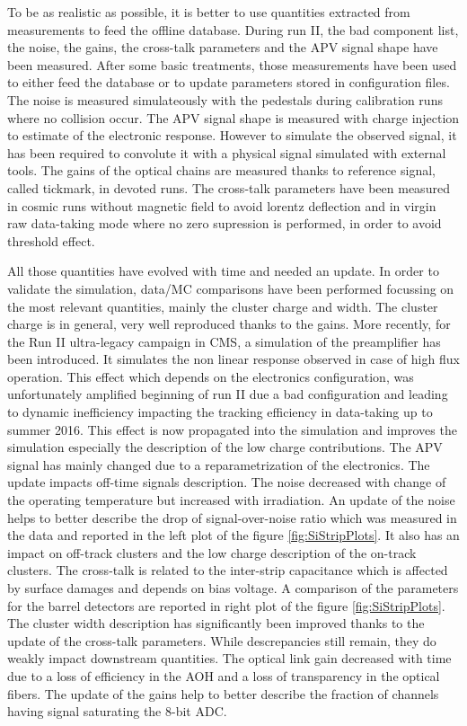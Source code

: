  
To be as realistic as possible, it is better to use quantities extracted from measurements to feed the offline database.%
During run II, the bad component list, the noise, the gains, the cross-talk parameters and the APV signal shape have been measured.
After some basic treatments, those measurements have been used to either feed the database or to update parameters stored in configuration files.
The noise is measured simulateously with the pedestals during calibration runs where no collision occur.
The APV signal shape is measured with charge injection 
to estimate of the electronic response.
However to simulate the observed signal, it has been required to convolute it with a physical signal simulated with external tools.
The gains of the optical chains are measured thanks to reference signal, called tickmark, in devoted runs.
The cross-talk parameters have been measured in cosmic runs without magnetic field to avoid lorentz deflection and in virgin raw data-taking mode where no zero supression is performed, in order to avoid threshold effect.

All those quantities have evolved with time and needed an update.
In order to validate the simulation, data/MC comparisons have been performed focussing on the most relevant quantities, mainly the cluster charge and width.
The cluster charge is in general, very well reproduced thanks to the gains.
More recently, for the Run II ultra-legacy campaign in CMS, a simulation of the preamplifier has been introduced.
It simulates the non linear response observed in case of high flux operation.
This effect which depends on the electronics configuration, was unfortunately amplified beginning of run II due a bad configuration and leading to dynamic inefficiency impacting the tracking efficiency in data-taking up to summer 2016.
This effect is now propagated into the simulation and improves the simulation especially  the description of the low charge contributions.
The APV signal has mainly changed due to a reparametrization of the electronics.
The update impacts off-time signals description.
The noise decreased with change of the operating temperature but increased with irradiation.
An update of the noise helps to better describe the drop of signal-over-noise ratio which was measured in the data and reported in the left plot of the figure \ref{fig:SiStripPlots}.
It also has an impact on off-track clusters and the low charge description of the on-track clusters. 
The cross-talk is related to the inter-strip capacitance which is affected by surface damages and depends on bias voltage.
A comparison of the parameters for the barrel detectors are reported in right plot of the figure \ref{fig:SiStripPlots}.
The cluster width description has significantly been improved  thanks to the update of the cross-talk parameters.
While descrepancies still remain, they do weakly impact downstream quantities.
The optical link gain decreased with time due to a loss of efficiency in the AOH and a loss of transparency in the optical fibers. 
The update of the gains help to better describe the fraction of channels having signal saturating the 8-bit ADC.


